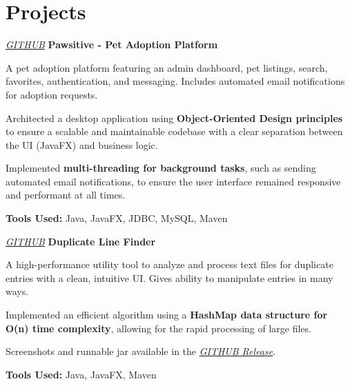 \section{Projects}

    \begin{twocolentry}{
    \textit{\href{https://github.com/ehsan18t/PetAdoption}{GITHUB}}}
        \textbf{Pawsitive - Pet Adoption Platform}
    \end{twocolentry}

    \begin{onecolentry}
        \begin{highlights}
            \item A pet adoption platform featuring an admin dashboard, pet listings, search, favorites, authentication, and messaging. Includes automated email notifications for adoption requests.
            \item Architected a desktop application using \textbf{Object-Oriented Design principles} to ensure a scalable and maintainable codebase with a clear separation between the UI (JavaFX) and business logic.
            \item Implemented \textbf{multi-threading for background tasks}, such as sending automated email notifications, to ensure the user interface remained responsive and performant at all times.
            \item \textbf{Tools Used:} Java, JavaFX, JDBC, MySQL, Maven
        \end{highlights}
    \end{onecolentry}

    \vspace{0.2 cm}

    \begin{twocolentry}{
    \textit{\href{https://github.com/ehsan18t/duplicate-line-finder}{GITHUB}}}
        \textbf{Duplicate Line Finder}
    \end{twocolentry}

    \begin{onecolentry}
        \begin{highlights}
            \item A high-performance utility tool to analyze and process text files for duplicate entries with a clean, intuitive UI.  Gives ability to manipulate entries in many ways.
            \item Implemented an efficient algorithm using a \textbf{HashMap data structure for O(n) time complexity}, allowing for the rapid processing of large files.
            \item Screenshots and runnable jar available in the \textit{\href{https://github.com/ehsan18t/duplicate-line-finder/releases/latest}{GITHUB Release}}.
            \item \textbf{Tools Used:} Java, JavaFX, Maven
        \end{highlights}
    \end{onecolentry}

